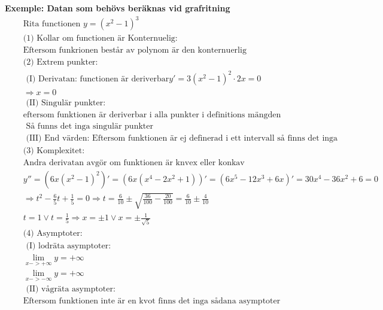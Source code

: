 \documentclass{article}
\begin{document}
\textbf{Exemple: Datan som behövs beräknas vid grafritning}
\begin{align*}
  &\quad  \text{Rita functionen } y={(x^2-1)}^3 \\
  &\quad  \text{(1) Kollar om functionen är Konternuelig:} \\
  &\quad  \text{Eftersom funkrionen består av polynom är den konternuerlig}   \\
  &\quad  \text{(2) Extrem punkter: }   \\
  &\quad  \text{ (I) Derivatan: functionen är deriverbar} y'=3{(x^2-1)}^2 \cdot 2x=0 \\
  &\quad  \Rightarrow x=0  \\
  &\quad  \text{ (II) Singulär punkter:} \\
  &\quad  \text{eftersom funktionen är deriverbar i alla punkter i definitions mängden } \\
  &\quad  \text{ Så funns det inga singulär punkter} \\
  &\quad  \text{ (III) End värden: Eftersom funktionen är ej definerad i ett intervall så finns det inga } \\
  &\quad  \text{(3) Komplexitet: } \\
  &\quad  \text{Andra derivatan avgör om funktionen är knvex eller konkav} \\
  &\quad  y''=(6x{(x^2-1)}^2)'= (6x{(x^4-2x^2+1)})' = (6x^5-12x^3+6x)' = 30x^4-36x^2+6 = 0 \\
  &\quad  \Rightarrow t^2-\frac{6}{5}t+\frac{1}{5}=0 \Rightarrow t=\frac{6}{10}\pm
  \sqrt{\frac{36}{100}-\frac{20}{100}} = \frac{6}{10} \pm \frac{4}{10}  \\
  &\quad  t=1 \lor t=\frac{1}{5} \Rightarrow x=\pm1 \lor x=\pm\frac{1}{\sqrt{5}}  \\
  &\quad  \text{(4) Asymptoter: } \\
  &\quad  \text{ (I) lodräta asymptoter: }  \\
  &\quad  \lim_{x->+\infty}y=+\infty \\
  &\quad  \lim_{x->-\infty}y=+\infty \\
  &\quad  \text{ (II) vågräta asymptoter:} \\
  &\quad  \text{Eftersom funktionen inte är en kvot finns det inga sådana asymptoter }  \\
\end{align*}
\end{document}
